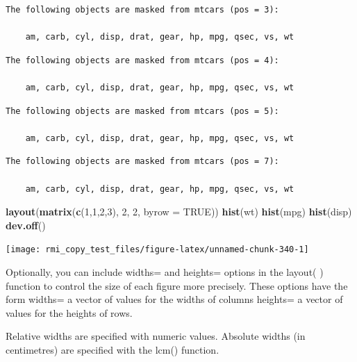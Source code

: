 \documentclass[]{book}
\newenvironment{Shaded}{\begin{snugshade}}{\end{snugshade}}
\newcommand{\DataTypeTok}[1]{\textcolor[rgb]{0.13,0.29,0.53}{#1}}
\newcommand{\DecValTok}[1]{\textcolor[rgb]{0.00,0.00,0.81}{#1}}
\newcommand{\KeywordTok}[1]{\textcolor[rgb]{0.13,0.29,0.53}{\textbf{#1}}}
\newcommand{\NormalTok}[1]{#1}
\newcommand{\OtherTok}[1]{\textcolor[rgb]{0.56,0.35,0.01}{#1}}
\theoremstyle{definition}
\theoremstyle{definition}
\theoremstyle{definition}
\theoremstyle{remark}
\begin{document}
\begin{verbatim}
The following objects are masked from mtcars (pos = 3):

    am, carb, cyl, disp, drat, gear, hp, mpg, qsec, vs, wt
\end{verbatim}

\begin{verbatim}
The following objects are masked from mtcars (pos = 4):

    am, carb, cyl, disp, drat, gear, hp, mpg, qsec, vs, wt
\end{verbatim}

\begin{verbatim}
The following objects are masked from mtcars (pos = 5):

    am, carb, cyl, disp, drat, gear, hp, mpg, qsec, vs, wt
\end{verbatim}

\begin{verbatim}
The following objects are masked from mtcars (pos = 7):

    am, carb, cyl, disp, drat, gear, hp, mpg, qsec, vs, wt
\end{verbatim}

\begin{Shaded}
\begin{Highlighting}[]
\KeywordTok{layout}\NormalTok{(}\KeywordTok{matrix}\NormalTok{(}\KeywordTok{c}\NormalTok{(}\DecValTok{1}\NormalTok{,}\DecValTok{1}\NormalTok{,}\DecValTok{2}\NormalTok{,}\DecValTok{3}\NormalTok{), }\DecValTok{2}\NormalTok{, }\DecValTok{2}\NormalTok{, }\DataTypeTok{byrow =} \OtherTok{TRUE}\NormalTok{))}
\KeywordTok{hist}\NormalTok{(wt)}
\KeywordTok{hist}\NormalTok{(mpg)}
\KeywordTok{hist}\NormalTok{(disp)}
\KeywordTok{dev.off}\NormalTok{()}
\end{Highlighting}
\end{Shaded}

\begin{center}\texttt{[image: rmi\_copy\_test\_files/figure-latex/unnamed-chunk-340-1]} \end{center}

Optionally, you can include widths= and heights= options in the layout(
) function to control the size of each figure more precisely. These
options have the form widths= a vector of values for the widths of
columns heights= a vector of values for the heights of rows.

Relative widths are specified with numeric values. Absolute widths (in
centimetres) are specified with the lcm() function.
\end{document}
